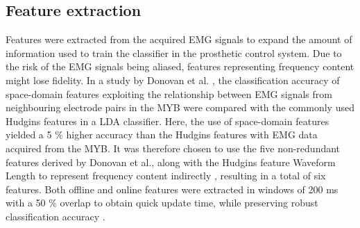 \subsection{Feature extraction}
Features were extracted from the acquired EMG signals to expand the amount of information used to train the classifier in the prosthetic control system. Due to the risk of the EMG signals being aliased, features representing frequency content might lose fidelity. In a study by Donovan et al. \cite{Donovan2017}, the classification accuracy of space-domain features exploiting the relationship between EMG signals from neighbouring electrode pairs in the MYB were compared with the commonly used Hudgins features in a LDA classifier. Here, the use of space-domain features yielded a 5 $\percent$ higher accuracy than the Hudgins features with EMG data acquired from the MYB. It was therefore chosen to use the five non-redundant features derived by Donovan et al., along with the Hudgins feature Waveform Length to represent frequency content indirectly \cite{Hudgins1993}, resulting in a total of six features. Both offline and online features were extracted in windows of 200 ms with a 50 $\percent$ overlap to obtain quick update time, while preserving robust classification accuracy \cite{Menon2017}. 
